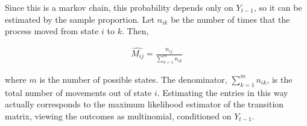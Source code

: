 \documentclass{article}
\begin{document}
Since this is a markov chain, this probability depends only on $Y_{t−1}$, so it can be estimated by the sample proportion. Let $n_{ik}$ be the number of times that the process moved from state $i$ to $k$. Then,

\begin{align}
    \hat{M_{ij}}=\frac{n_{ij}}{\sum^m_{k=1}n_{ik}}
\end{align}


where $m$ is the number of possible states. The denominator, $\sum^m_{k=1}n_{ik}$, is the total number of movements out of state $i$. Estimating the entries in this way actually corresponds to the maximum likelihood estimator of the transition matrix, viewing the outcomes as multinomial, conditioned on $Y_{t-1}$.
\end{document}
